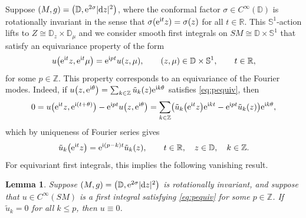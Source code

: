 \documentclass[pdftex]{sigma}
\numberwithin{equation}{section}
\newtheorem{Lemma}[Theorem]{Lemma}
\theoremstyle{definition}
\newcommand{\Z}{\mathbb{Z}} %
\newcommand{\R}{\mathbb{R}} %
\newcommand{\1}{{\bf 1}}
\newcommand \Dm { \mathbb{D}}
\newcommand \Zm { \mathbb{Z}}
\newcommand \tu {\tilde{u}}
\begin{document}
Suppose $(M,g) = \bigl(\Dm, {\rm e}^{2\sigma} |{\rm d}z|^2\bigr)$, where the conformal factor $\sigma\in C^\infty(\Dm)$ is rotationally invariant in the sense that $\sigma({\rm e}^{{\rm i}t} z) = \sigma(z)$ for all $t\in \R$. This $\mathbb S^1$-action lifts to $Z\cong \Dm_z\times \Dm_\mu$ and we consider smooth first integrals on $SM\cong \Dm\times \mathbb S^1$ that satisfy an equivariance property of the form
\begin{align}
	u \bigl({\rm e}^{{\rm i}t}z, {\rm e}^{{\rm i}t}\mu\bigr) = {\rm e}^{{\rm i}pt} u (z,\mu), \qquad (z,\mu)\in \Dm\times \mathbb S^1,\qquad t\in \R,
	\label{eq:pequiv}
\end{align}
for some $p\in \Z$. This property corresponds to an equivariance of the Fourier modes. Indeed, if $u\bigl(z,{\rm e}^{{\rm i}\theta}\bigr) = \sum_{k\in \Zm} \tu_k(z) {\rm e}^{{\rm i}k\theta}$ satisfies \eqref{eq:pequiv}, then
\begin{align*}
	0 = u \bigl({\rm e}^{{\rm i}t}z, {\rm e}^{{\rm i}(t+\theta)}\bigr) - {\rm e}^{{\rm i}pt} u \bigl(z,{\rm e}^{{\rm i}\theta}\bigr) = \sum_{k\in \Zm} \bigl( \tu_k\bigl({\rm e}^{{\rm i}t}z\bigr) {\rm e}^{{\rm i}kt} - {\rm e}^{{\rm i}pt} \tu_k(z) \bigr) {\rm e}^{{\rm i}k\theta},
\end{align*}
which by uniqueness of Fourier series gives
\begin{align}
	\tu_k\bigl({\rm e}^{{\rm i}t}z\bigr) = {\rm e}^{{\rm i}(p-k)t} \tu_k(z), \qquad t\in \R,\quad z\in \Dm,\quad k\in \Zm.
	\label{eq:modesEquiv}
\end{align}
For equivariant first integrals, this implies the following vanishing result.
\begin{Lemma}\label{lem:vanishing} Suppose $(M,g) = \bigl(\Dm, {\rm e}^{2\sigma} |{\rm d}z|^2\bigr)$ is rotationally invariant, and suppose that $u\in C^\infty(SM)$ is a first integral satisfying \eqref{eq:pequiv} for some $p\in \Zm$. If $\tu_k= 0$ for all $k\le p$, then $u\equiv 0$.
\end{Lemma}
\end{document}
